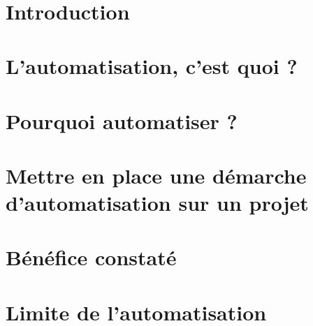 \documentclass[11pt,a4paper]{article}
\begin{document}
	\pagestyle{plain} %
	 
\newpage
	~ %
\newpage
	\listoftodos 
\newpage
	\renewcommand{\contentsname}{Sommaire}
	\tableofcontents
\newpage
	\pagenumbering{\numerotationType} %
	\section*{Introduction}
	
\newpage
	\pagestyle{fancy}
	
	\renewcommand{\sectionmark}[1]{\markright{#1}}
	\renewcommand{\subsectionmark}[1]{\markright{#1}}
	\renewcommand{\subsubsectionmark}[1]{\markright{#1}}
	
	\lhead{\fancyplain{}{}}
	\chead{\fancyplain{}}
	\rhead{\fancyplain{}{\rightmark}}
	
	\lfoot{\fancyplain{}{}}	
	\cfoot{\fancyplain{}{}}	
	\rfoot{\fancyplain{}{\thepage}}

  \section{L'automatisation, c'est quoi ?}
	
\newpage
	\section{Pourquoi automatiser ?}
	
\newpage
	\section{Mettre en place une démarche d'automatisation sur un projet}
	
\newpage
	\section{Bénéfice constaté}
	
\newpage
	\section{Limite de l'automatisation}
	
\newpage
	\pagestyle{plain} %
\end{document}
